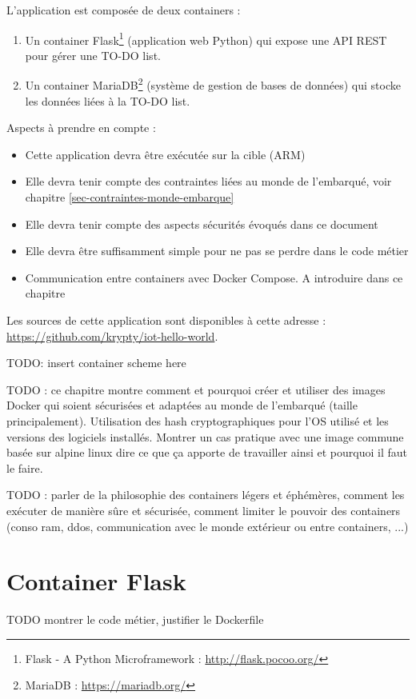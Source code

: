 \documentclass[11pt,a4paper,oneside]{report}
\begin{document}
L'application est composée de deux containers :
\begin{enumerate}
\item Un container Flask\footnote{Flask - A Python Microframework : \url{http://flask.pocoo.org/}} (application web Python) qui expose une API REST pour gérer une TO-DO list.
\item Un container MariaDB\footnote{MariaDB : \url{https://mariadb.org/}} (système de gestion de bases de données) qui stocke les données liées à la TO-DO list.
\end{enumerate}

Aspects à prendre en compte :
\begin{itemize}
\item Cette application devra être exécutée sur la cible (ARM)
\item Elle devra tenir compte des contraintes liées au monde de l'embarqué, voir chapitre \ref{sec-contraintes-monde-embarque}
\item Elle devra tenir compte des aspects sécurités évoqués dans ce document
\item Elle devra être suffisamment simple pour ne pas se perdre dans le code métier
\item Communication entre containers avec Docker Compose. A introduire dans ce chapitre
\end{itemize}


Les sources de cette application sont disponibles à cette adresse : \url{https://github.com/krypty/iot-hello-world}.

TODO: insert container scheme here

TODO : ce chapitre montre comment et pourquoi créer et utiliser des images Docker qui soient sécurisées et adaptées au monde de l'embarqué (taille principalement). Utilisation des hash cryptographiques pour l'OS utilisé et les versions des logiciels installés.
Montrer un cas pratique avec une image commune basée sur alpine linux dire ce que ça apporte de travailler ainsi et pourquoi il faut le faire.

TODO : parler de la philosophie des containers légers et éphémères, comment les exécuter de manière sûre et sécurisée, comment limiter le pouvoir des containers (conso ram, ddos, communication avec le monde extérieur ou entre containers, ...)

\section{Container Flask}
TODO montrer le code métier, justifier le Dockerfile
\end{document}

